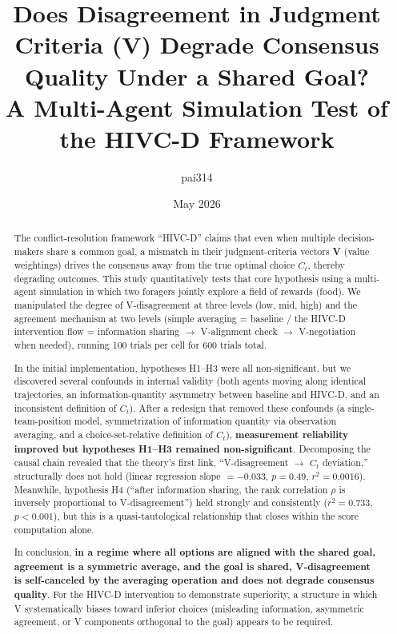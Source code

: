 \documentclass[11pt]{article}
\title{Does Disagreement in Judgment Criteria (V) Degrade Consensus Quality Under a Shared Goal?\\[2pt]
\large A Multi-Agent Simulation Test of the HIVC-D Framework}
\author{pai314}
\date{May 2026}
\newcommand{\Ct}{\ensuremath{C_t}}
\begin{document}
\maketitle

\begin{abstract}
The conflict-resolution framework ``HIVC-D'' claims that even when multiple decision-makers share a common goal, a mismatch in their judgment-criteria vectors \textbf{V} (value weightings) drives the consensus away from the true optimal choice \Ct{}, thereby degrading outcomes. This study quantitatively tests that core hypothesis using a multi-agent simulation in which two foragers jointly explore a field of rewards (food). We manipulated the degree of V-disagreement at three levels (low, mid, high) and the agreement mechanism at two levels (simple averaging = baseline / the HIVC-D intervention flow = information sharing $\to$ V-alignment check $\to$ V-negotiation when needed), running 100 trials per cell for 600 trials total.

In the initial implementation, hypotheses H1--H3 were all non-significant, but we discovered several confounds in internal validity (both agents moving along identical trajectories, an information-quantity asymmetry between baseline and HIVC-D, and an inconsistent definition of \Ct{}). After a redesign that removed these confounds (a single-team-position model, symmetrization of information quantity via observation averaging, and a choice-set-relative definition of \Ct{}), \textbf{measurement reliability improved but hypotheses H1--H3 remained non-significant}. Decomposing the causal chain revealed that the theory's first link, ``V-disagreement $\to$ \Ct{} deviation,'' structurally does not hold (linear regression slope $=-0.033$, $p=0.49$, $r^2=0.0016$). Meanwhile, hypothesis H4 (``after information sharing, the rank correlation $\rho$ is inversely proportional to V-disagreement'') held strongly and consistently ($r^2=0.733$, $p<0.001$), but this is a quasi-tautological relationship that closes within the score computation alone.

In conclusion, \textbf{in a regime where all options are aligned with the shared goal, agreement is a symmetric average, and the goal is shared, V-disagreement is self-canceled by the averaging operation and does not degrade consensus quality}. For the HIVC-D intervention to demonstrate superiority, a structure in which V systematically biases toward inferior choices (misleading information, asymmetric agreement, or V components orthogonal to the goal) appears to be required.
\end{abstract}
\end{document}

